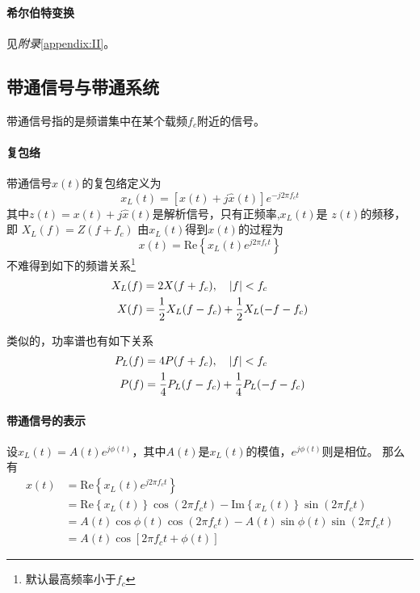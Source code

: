     \paragraph{希尔伯特变换}\mbox{}

    见\emph{附录}\ref{appendix:II}。

\subsection{带通信号与带通系统}
    带通信号指的是频谱集中在某个载频$f_c$附近的信号。
    \paragraph{复包络}\mbox{}

    带通信号$x(t)$的复包络定义为
    \begin{equation}
        x_L(t)=[x(t)+j\hat{x}(t)]e^{-j2\pi f_ct}
    \end{equation}
    其中$z(t)=x(t)+j\hat{x}(t)$是解析信号，只有正频率,$x_L(t)$是 $z(t)$的频移，即
    $X_L(f)=Z(f+f_c)$
    由$x_L(t)$得到$x(t)$的过程为
    \begin{equation}
        x(t)=\text{Re}\left\{x_L(t)e^{j2\pi f_ct}\right\}
    \end{equation}
    不难得到如下的频谱关系\footnote{默认最高频率小于$f_c$}
    \begin{align}\label{eq:xl_x}
        X_L(f)&=2X(f+f_c),\hspace{1em}\left\vert f \right\vert<f_c\\
        X(f)&=\frac{1}{2}X_L(f-f_c)+\frac{1}{2}X_L(-f-f_c)
    \end{align}

    类似的，功率谱也有如下关系
    \begin{align}
        P_L(f)&=4P(f+f_c),\hspace{1em}\left\vert f \right\vert<f_c\\
        P(f)&=\frac{1}{4}P_L(f-f_c)+\frac{1}{4}P_L(-f-f_c)
    \end{align}

    \paragraph{带通信号的表示}\mbox{}

    设$x_L(t)=A(t)e^{j\phi (t)}$，其中$A(t)$是$x_L(t)$的模值，$e^{j\phi (t)}$则是相位。
    那么有
    \begin{equation}
        \begin{split}
            x(t)&=\text{Re}\left\{x_L(t)e^{j2\pi f_ct}\right\}\\
                &=\text{Re}\left\{x_L(t)\right\}\cos (2\pi f_ct)-\text{Im}\left\{x_L(t)\right\}\sin (2\pi f_ct)\\
                &=A(t)\cos\phi(t)\cos (2\pi f_ct)-A(t)\sin\phi(t)\sin (2\pi f_ct)\\
                &=A(t)\cos[2\pi f_ct+\phi(t)]
        \end{split}
    \end{equation}

